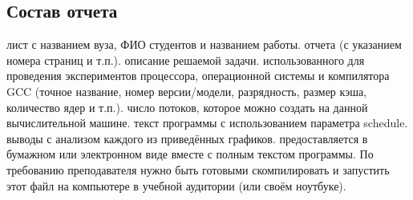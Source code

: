 \subsection{Состав отчета}
\begin{enumerate}
     лист с названием вуза, ФИО студентов и названием работы.
     отчета (с указанием номера страниц и т.п.).
     описание решаемой задачи.
     использованного для проведения экспериментов процессора, операционной системы и компилятора GCC (точное название, номер версии/модели, разрядность, размер кэша, количество ядер и т.п.).
     число потоков, которое можно создать на данной вычислительной машине.
     текст программы с использованием параметра schedule.
     выводы с анализом каждого из приведённых графиков.
     предоставляется в бумажном или электронном виде вместе с полным текстом программы. По требованию преподавателя нужно быть готовыми скомпилировать и запустить этот файл на компьютере в учебной аудитории (или своём ноутбуке).
\end{enumerate}
